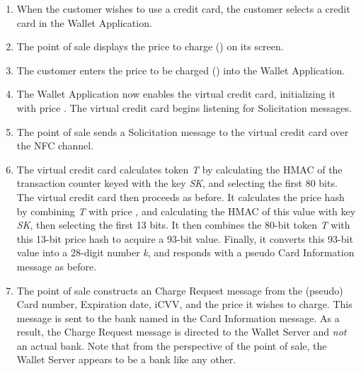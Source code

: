 \begin{enumerate}
\item When the customer wishes to use a credit card, the customer selects a credit card in the Wallet Application.

\item The point of sale displays the price to charge () on its screen.

\item The customer enters the price to be charged () into the Wallet Application.

\item The Wallet Application now enables the virtual credit card, initializing it with price .
    The virtual credit card begins listening for Solicitation messages.

\item The point of sale sends a Solicitation message to the virtual credit card over the NFC channel.

\item
    The virtual credit card calculates token \emph{T} by calculating the HMAC of the transaction counter keyed with the key \emph{SK}, and selecting the first 80 bits.
    The virtual credit card then proceeds as before.
    It calculates the price hash by combining \emph{T} with price ,
        and calculating the HMAC of this value with key \emph{SK}, then selecting the first 13 bits.
    It then combines the 80-bit token \emph{T} with this 13-bit price hash to acquire a 93-bit value.
    Finally, it converts this 93-bit value into a 28-digit number \emph{k}, and responds with a pseudo Card Information message as before.

\item The point of sale constructs an Charge Request message from the (pseudo) Card number, Expiration date, iCVV, and the price it wishes to charge.
    This message is sent to the bank named in the Card Information message.
    As a result, the Charge Request message is directed to the Wallet Server and \emph{not} an actual bank.
    Note that from the perspective of the point of sale, the Wallet Server appears to be a bank like any other.


\end{enumerate}
